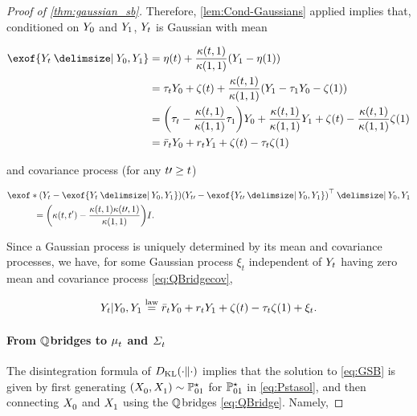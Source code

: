 \begin{proof}[Proof of \cref{thm:gaussian_sb}]
Therefore, \cref{lem:Cond-Gaussians} applied implies that, conditioned on $\refsde[0]$ and $\refsde[\horizon]$, $\refsde$ is Gaussian with mean

\begin{align}
\nn
\exof{  \refsde \given \refsde[0], \refsde[\horizon] } &= \mYcinit + \frac{\kernel[\ctime][\horizon]}{ \kernel[\horizon][\horizon] }\parens*{ \refsde[\horizon] - \mYcinit[\horizon] } \\
\nn
&= \aggtime \refsde[0] + \tshift + \frac{\kernel[\ctime][\horizon]}{ \kernel[\horizon][\horizon] }\parens*{ \refsde[\horizon] - \aggtime[\horizon]\refsde[0] - \tshift[\horizon] } \\
\nn
&= \parens*{  \aggtime -  \frac{\kernel[\ctime][\horizon]}{ \kernel[\horizon][\horizon] } \aggtime[\horizon] } \refsde[0] +  \frac{\kernel[\ctime][\horizon]}{ \kernel[\horizon][\horizon] } \refsde[\horizon] + \tshift -  \frac{\kernel[\ctime][\horizon]}{ \kernel[\horizon][\horizon] } \tshift[\horizon]  \\
\label{eq:QBridgem}
&= \ratioc \refsde[0] + \ratio \refsde[\horizon] + \tshift - \aggtime \tshift[\horizon]
\end{align}

and covariance process (for any $\ctime\prime \geq \ctime$)

\begin{align}
\label{eq:QBridgecov}
&\exof*{ \parens*{ \refsde - \exof{  \refsde \given \refsde[0], \refsde[\horizon] } }\parens*{ \refsde[\ctime\prime] - \exof{  \refsde[\ctime\prime] \given \refsde[0], \refsde[\horizon] } }^\top \given \refsde[0], \refsde[\horizon]  } \\
\nn 
&\quad\quad\quad= \parens*{   \kernel - \frac{\kernel[\ctime][\horizon] \kernel[\ctime\prime][\horizon]}{ \kernel[\horizon][\horizon]} } \eye.
\end{align}

Since a Gaussian process is uniquely determined by its mean and covariance processes, we have, for some Gaussian process $\xi_t$ independent of $\refsde$ having zero mean and covariance process \eqref{eq:QBridgecov},

\begin{equation}
\label{eq:QBridge}
\refsde \vert \refsde[0], \refsde[\horizon] \eqlaw \ratioc \refsde[0] + \ratio \refsde[\horizon] + \tshift - \aggtime \tshift[\horizon] + \xi_t.
\end{equation}


\paragraph{From $\refprobase$\textendash bridges to $\meansol$ and $\Sigmasol$}
The disintegration formula of $\KL(\cdot \| \cdot)$ \citep{leonard2013survey} implies that the solution to \eqref{eq:GSB} is given by first generating $(\Xsol[0], \Xsol[\horizon]) \sim \Pstasol$ for $\Pstasol$ in \eqref{eq:Pstasol}, and then connecting $\Xsol[0]$ and $\Xsol[\horizon]$ using the $\refprobase$\textendash bridges \eqref{eq:QBridge}. Namely,


\end{proof}
